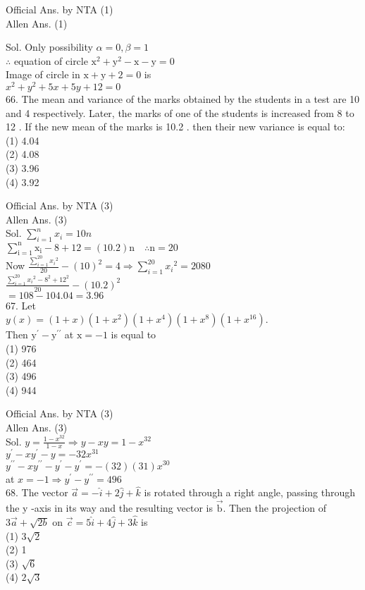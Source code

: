 \documentclass[10pt]{article}
\begin{document}
Official Ans. by NTA (1)\\
Allen Ans. (1)

Sol. Only possibility \(\alpha=0, \beta=1\)\\
\(\therefore\) equation of circle \(\mathrm{x}^{2}+\mathrm{y}^{2}-\mathrm{x}-\mathrm{y}=0\)\\
Image of circle in \(\mathrm{x}+\mathrm{y}+2=0\) is\\
\(x^{2}+y^{2}+5 x+5 y+12=0\)\\
66. The mean and variance of the marks obtained by the students in a test are 10 and 4 respectively. Later, the marks of one of the students is increased from 8 to 12 . If the new mean of the marks is 10.2 . then their new variance is equal to:\\
(1) 4.04\\
(2) 4.08\\
(3) 3.96\\
(4) 3.92

Official Ans. by NTA (3)\\
Allen Ans. (3)\\
Sol. \(\sum_{i=1}^{n} x_{i}=10 n\)\\
\(\sum_{\mathrm{i}=1}^{\mathrm{n}} \mathrm{x}_{\mathrm{i}}-8+12=(10.2) \mathrm{n} \quad \therefore \mathrm{n}=20\)\\
Now \(\frac{\sum_{i=1}^{20} x_{i}{ }^{2}}{20}-(10)^{2}=4 \Rightarrow \sum_{i=1}^{20} x_{i}{ }^{2}=2080\)\\
\(\frac{\sum_{i=1}^{20} x_{i}{ }^{2}-8^{2}+12^{2}}{20}-(10.2)^{2}\)\\
\(=108-104.04=3.96\)\\
67. Let\\
\(y(x)=(1+x)\left(1+x^{2}\right)\left(1+x^{4}\right)\left(1+x^{8}\right)\left(1+x^{16}\right)\).\\
Then \(\mathrm{y}^{\prime}-\mathrm{y}^{\prime \prime}\) at \(\mathrm{x}=-1\) is equal to\\
(1) 976\\
(2) 464\\
(3) 496\\
(4) 944

Official Ans. by NTA (3)\\
Allen Ans. (3)\\
Sol. \(y=\frac{1-x^{32}}{1-x} \Rightarrow y-x y=1-x^{32}\)\\
\(y^{\prime}-x y^{\prime}-y=-32 x^{31}\)\\
\(y^{\prime \prime}-x y^{\prime \prime}-y^{\prime}-y^{\prime}=-(32)(31) x^{30}\)\\
at \(x=-1 \Rightarrow y^{\prime}-y^{\prime \prime}=496\)\\
68. The vector \(\vec{a}=-\hat{i}+2 \hat{j}+\hat{k}\) is rotated through a right angle, passing through the y -axis in its way and the resulting vector is \(\overrightarrow{\mathrm{b}}\). Then the projection of \(3 \vec{a}+\sqrt{2 b}\) on \(\vec{c}=5 \hat{i}+4 \hat{j}+3 \hat{k}\) is\\
(1) \(3 \sqrt{2}\)\\
(2) 1\\
(3) \(\sqrt{6}\)\\
(4) \(2 \sqrt{3}\)
\end{document}
